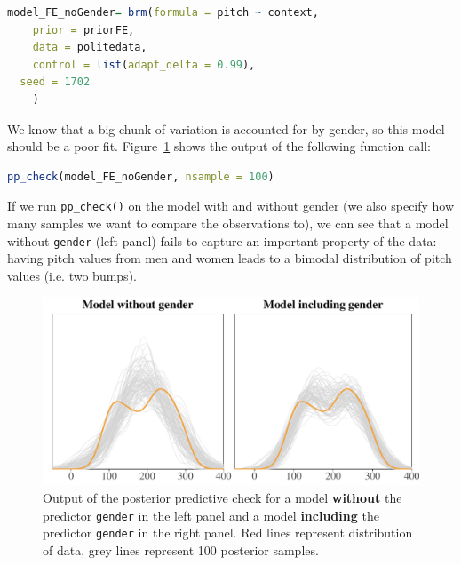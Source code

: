 \documentclass[nobib]{tufte-handout}
\begin{document}
\begin{minipage}[]{1\textwidth}
\begin{lstlisting}[language=R]
model_FE_noGender= brm(formula = pitch ~ context,
	prior = priorFE,
	data = politedata,
	control = list(adapt_delta = 0.99),
  seed = 1702
	)
\end{lstlisting}
\end{minipage}

\vspace{-0.5cm}

We know that a big chunk of variation is accounted for by gender, so this model should be a
poor fit. Figure~\ref{fig:PPC} shows the output of the following function call:

\begin{minipage}[]{1\textwidth}
\begin{lstlisting}[language=R]
pp_check(model_FE_noGender, nsample = 100)
\end{lstlisting}
\end{minipage}

\vspace{-0.5cm}

If we run \texttt{pp\_check()} on the model with and without gender (we also specify how many samples we want
to compare the observations to), we can see that a model without \texttt{gender} (left panel)
fails to capture an important property of the data: having pitch values from men and women
leads to a bimodal distribution of pitch values (i.e. two bumps).

\begin{figure}
  \centering
    \includegraphics[width = 1\textwidth]{pics/pp_checks_plot.pdf}
    \caption{Output of the posterior predictive check for a model \textbf{without} the predictor \texttt{gender} in the left panel and a model \textbf{including} the predictor \texttt{gender} in the right panel. Red lines represent distribution of data, grey lines represent 100 posterior samples.}
    \label{fig:PPC}
\end{figure}
\end{document}
